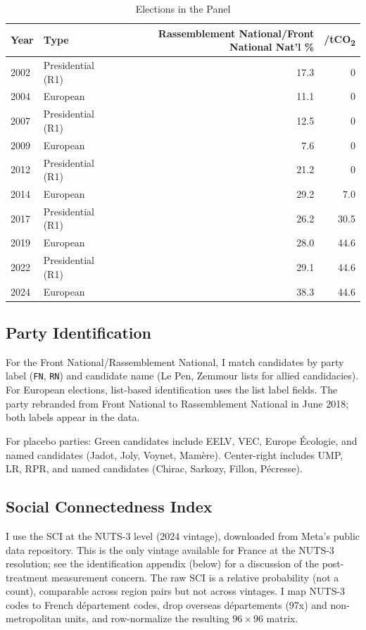 \documentclass[12pt]{article}
\providecommand{\euro}{\texteuro}
\newcommand{\rn}{Rassemblement National}
\newcommand{\fn}{Front National}
\newcommand{\dept}{d\'{e}partement}
\newcommand{\depts}{d\'{e}partements}
\begin{document}
\begin{table}[H]
\centering
\caption{Elections in the Panel}
\label{tab:elections}
\small
\begin{tabular}{@{}llrr@{}}
\toprule
Year & Type & \rn{}/\fn{} Nat'l \% & \euro/tCO\textsubscript{2} \\
\midrule
2002 & Presidential (R1) & 17.3 & 0 \\
2004 & European & 11.1 & 0 \\
2007 & Presidential (R1) & 12.5 & 0 \\
2009 & European & 7.6 & 0 \\
2012 & Presidential (R1) & 21.2 & 0 \\
2014 & European & 29.2 & 7.0 \\
2017 & Presidential (R1) & 26.2 & 30.5 \\
2019 & European & 28.0 & 44.6 \\
2022 & Presidential (R1) & 29.1 & 44.6 \\
2024 & European & 38.3 & 44.6 \\
\bottomrule
\end{tabular}
\end{table}

\subsection{Party Identification}

For the \fn{}/\rn{}, I match candidates by party label (\texttt{FN}, \texttt{RN}) and candidate name (Le Pen, Zemmour lists for allied candidacies). For European elections, list-based identification uses the list label fields. The party rebranded from \fn{} to \rn{} in June 2018; both labels appear in the data.

For placebo parties: Green candidates include EELV, VEC, Europe \'{E}cologie, and named candidates (Jadot, Joly, Voynet, Mam\`{e}re). Center-right includes UMP, LR, RPR, and named candidates (Chirac, Sarkozy, Fillon, P\'{e}cresse).

\subsection{Social Connectedness Index}

I use the SCI at the NUTS-3 level (2024 vintage), downloaded from Meta's public data repository. This is the only vintage available for France at the NUTS-3 resolution; see the identification appendix (below) for a discussion of the post-treatment measurement concern. The raw SCI is a relative probability (not a count), comparable across region pairs but not across vintages. I map NUTS-3 codes to French \dept{} codes, drop overseas \depts{} (97x) and non-metropolitan units, and row-normalize the resulting $96 \times 96$ matrix.
\end{document}
